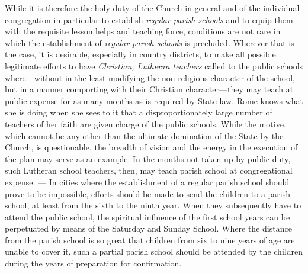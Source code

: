 While it is therefore the holy duty of the Church in general and of the individual congregation in particular to establish \emph{regular parish schools} and to equip them with the requisite lesson helps and teaching force, conditions are not rare in which the establishment of \emph{regular parish schools} is precluded. Wherever that is the case, it is desirable, especially in country districts, to make all possible legitimate efforts to have \emph{Christian, Lutheran teachers} called to the public schools where—without in the least modifying the non-religious character of the school, but in a manner comporting with their Christian character—they may teach at public expense for as many months as is required by State law. Rome knows what she is doing when she sees to it that a disproportionately large number of teachers of her faith are given charge of the public schools. While the motive, which cannot be any other than the ultimate domination of the State by the Church, is questionable, the breadth of vision and the energy in the execution of the plan may serve as an example. In the months not taken up by public duty, such Lutheran school teachers, then, may teach parish school at congregational expense. — In cities where the establishment of a regular parish school should prove to be impossible, efforts should be made to send the children to a parish school, at least from the sixth to the ninth year. When they subsequently have to attend the public school, the spiritual influence of the first school years can be perpetuated
by means of the Saturday and Sunday School. Where the distance from the parish school is so great that children from six to nine years of age are unable to cover it, such a partial parish school should be attended by the children during the years of preparation for confirmation.

